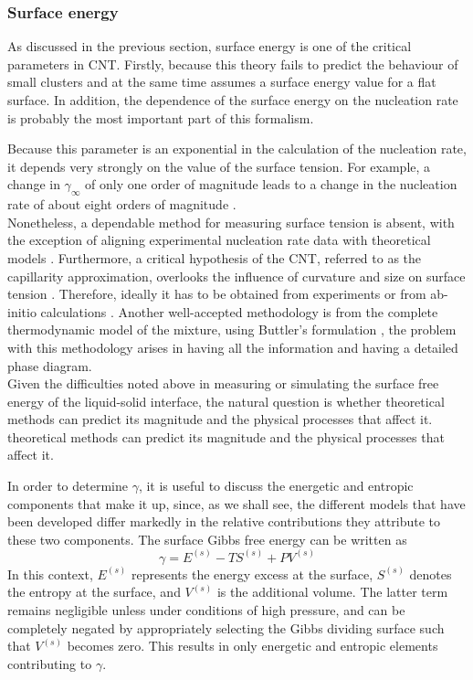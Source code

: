 \subsubsection{Surface energy}

As discussed in the previous section, surface energy is one of the critical parameters in CNT. Firstly, because this theory fails to predict the behaviour of small clusters 
and at the same time assumes a surface energy value for a flat surface. In addition, the dependence of the surface energy on the nucleation rate is probably the most important part of this formalism. 

Because this parameter is an exponential in the calculation of the nucleation rate, it depends very strongly on the value of the surface tension. For example, a change in $\gamma_{\infty}$ of only one order of magnitude
leads to a change in the nucleation rate of about eight orders of magnitude \cite{Ulbricht1998}.
\\
Nonetheless, a dependable method for measuring surface tension is absent, with the exception of aligning experimental nucleation rate data with theoretical models \cite{Fokin2006HomogeneousCN}. 
Furthermore, a critical hypothesis of the CNT, referred to as the capillarity approximation, overlooks the influence of curvature and size on surface tension \cite{SANGWAL19963}.
Therefore, ideally it has to be obtained from experiments or from ab-initio calculations \cite{Sun2020, Lee2018, Vitos1998, Holec2012, Binnie2010}. 
Another well-accepted methodology is from the complete thermodynamic model of the mixture, using Buttler's formulation \cite{Silva, Picha2004, Krasin2015}, 
the problem with this methodology arises in having all the information and having a detailed phase diagram.
\\
Given the difficulties noted above in measuring or simulating the surface free energy of the liquid-solid interface, the natural question is whether theoretical methods 
can predict its magnitude and the physical processes that affect it. 
theoretical methods can predict its magnitude and the physical processes that affect it. 

In order to determine $\gamma$, it is useful to discuss the energetic and entropic components that make it up, 
since, as we shall see, the different models that have been developed differ markedly in the relative contributions they attribute to these two components. 
The surface Gibbs free energy can be written as
\begin{equation} \label{eq:Gibbs_free_energy}
\gamma = E^{(s)} - T S^{(s)} + P V^{(s)}
\end{equation}
In this context, $E^{(s)}$ represents the energy excess at the surface, $S^{(s)}$ denotes the entropy at the surface, and $V^{(s)}$ is the additional volume. 
The latter term remains negligible unless under conditions of high pressure, and can be completely negated by appropriately selecting the Gibbs dividing surface such 
that $V^{(s)}$ becomes zero. This results in only energetic and entropic elements contributing to $\gamma$.

